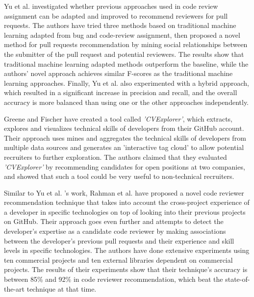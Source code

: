         Yu et al. \cite{yu2016reviewer} investigated whether previous approaches used in code review assignment can be adapted and improved to recommend reviewers for pull requests. The authors have tried three methods based on traditional machine learning adapted from bug and code-review assignment, then proposed a novel method for pull requests recommendation by mining social relationships between the submitter of the pull request and potential reviewers. The results show that traditional machine learning adapted methods outperform the baseline, while the authors' novel approach achieves similar F-scores as the traditional machine learning approaches. Finally, Yu et al. also experimented with a hybrid approach, which resulted in a significant increase in precision and recall, and the overall accuracy is more balanced than using one or the other approaches independently.
        
        Greene and Fischer \cite{greene2016cvexplorer} have created a tool called \emph{'CVExplorer'}, which extracts, explores and visualizes technical skills of developers from their GitHub account. Their approach uses mines and aggregates the technical skills of developers from multiple data sources and generates an 'interactive tag cloud' to allow potential recruiters to further exploration. The authors claimed that they evaluated \emph{'CVExplorer'} by recommending candidates for open positions at two companies, and showed that such a tool could be very useful to non-technical recruiters. 
    
        Similar to Yu et al. \cite{yu2016reviewer}'s work, Rahman et al. \cite{rahman2016correct} have proposed a novel code reviewer recommendation technique that takes into account the cross-project experience of a developer in specific technologies on top of looking into their previous projects on GitHub. Their approach goes even further and attempts to detect the developer's expertise as a candidate code reviewer by making associations between the developer's previous pull requests and their experience and skill levels in specific technologies. The authors have done extensive experiments using ten commercial projects and ten external libraries dependent on commercial projects. The results of their experiments show that their technique's accuracy is between 85\% and 92\% in code reviewer recommendation, which beat the state-of-the-art technique at that time.
        
